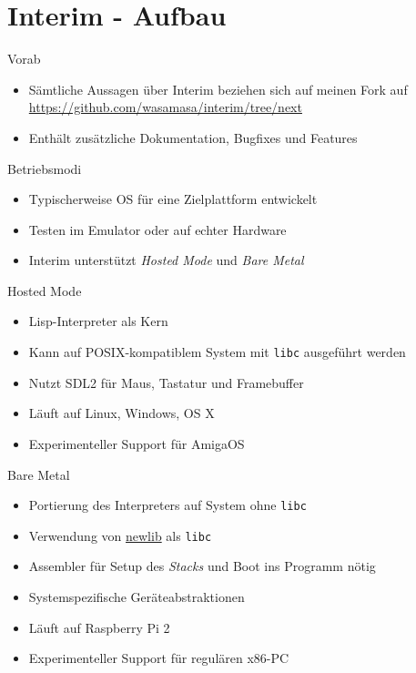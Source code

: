 \documentclass[presentation]{beamer}
\begin{document}
\section{Interim - Aufbau}
\label{sec-2}

\begin{frame}[label=sec-2-1]{Vorab}
\begin{itemize}
\item Sämtliche Aussagen über Interim beziehen sich auf meinen Fork auf
\url{https://github.com/wasamasa/interim/tree/next}
\item Enthält zusätzliche Dokumentation, Bugfixes und Features
\end{itemize}
\end{frame}

\begin{frame}[label=sec-2-2]{Betriebsmodi}
\begin{itemize}
\item Typischerweise OS für eine Zielplattform entwickelt
\item Testen im Emulator oder auf echter Hardware
\item Interim unterstützt \emph{Hosted Mode} und \emph{Bare Metal}
\end{itemize}
\end{frame}

\begin{frame}[fragile,label=sec-2-3]{Hosted Mode}
 \begin{itemize}
\item Lisp-Interpreter als Kern
\item Kann auf POSIX-kompatiblem System mit \texttt{libc} ausgeführt werden
\item Nutzt SDL2 für Maus, Tastatur und Framebuffer
\item Läuft auf Linux, Windows, OS X
\item Experimenteller Support für AmigaOS
\end{itemize}
\end{frame}

\begin{frame}[fragile,label=sec-2-4]{Bare Metal}
 \begin{itemize}
\item Portierung des Interpreters auf System ohne \texttt{libc}
\item Verwendung von \href{https://sourceware.org/newlib/}{newlib} als \texttt{libc}
\item Assembler für Setup des \emph{Stacks} und Boot ins Programm nötig
\item Systemspezifische Geräteabstraktionen
\item Läuft auf Raspberry Pi 2
\item Experimenteller Support für regulären x86-PC
\end{itemize}
\end{frame}
\end{document}
